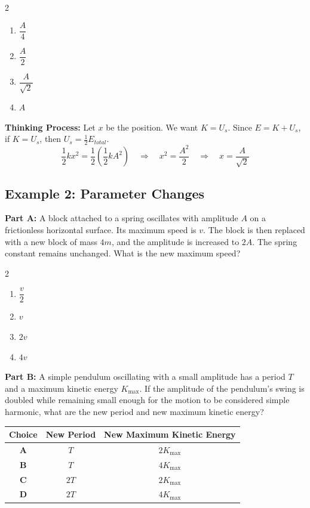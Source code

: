 \documentclass[12pt]{article}
\begin{document}
\begin{multicols}{2}
\begin{enumerate}[label=\textbf{\Alph*.}]
\item $\dfrac{A}{4}$
\item $\dfrac{A}{2}$
\item $\dfrac{A}{\sqrt{2}}$
\item $A$
\end{enumerate}
\end{multicols}

\textbf{Thinking Process:} Let $x$ be the position. We want $K = U_s$. Since $E = K + U_s$, if $K = U_s$, then $U_s = \frac{1}{2}E_{total}$.
\[ \frac{1}{2}kx^2 = \frac{1}{2} \left(\frac{1}{2}kA^2\right) \quad \Rightarrow \quad x^2 = \frac{A^2}{2} \quad \Rightarrow \quad x = \frac{A}{\sqrt{2}} \]

\vspace{0.3cm}

\subsection*{Example 2: Parameter Changes}
\textbf{Part A:} A block attached to a spring oscillates with amplitude $A$ on a frictionless horizontal surface. Its maximum speed is $v$. The block is then replaced with a new block of mass $4m$, and the amplitude is increased to $2A$. The spring constant remains unchanged. What is the new maximum speed?

\begin{multicols}{2}
\begin{enumerate}[label=\textbf{\Alph*.}]
\item $\dfrac{v}{2}$
\item $v$
\item $2v$
\item $4v$
\end{enumerate}
\end{multicols}

\textbf{Part B:} A simple pendulum oscillating with a small amplitude has a period $T$ and a maximum kinetic energy $K_{\max}$. If the amplitude of the pendulum's swing is doubled while remaining small enough for the motion to be considered simple harmonic, what are the new period and new maximum kinetic energy?

\begin{center}
\begin{tabular}{>{\bfseries}c c c}
\toprule
Choice & New Period & New Maximum Kinetic Energy \\
\midrule
A & $T$ & $2K_{\max}$ \\
B & $T$ & $4K_{\max}$ \\
C & $2T$ & $2K_{\max}$ \\
D & $2T$ & $4K_{\max}$ \\
\bottomrule
\end{tabular}
\end{center}
\end{document}
